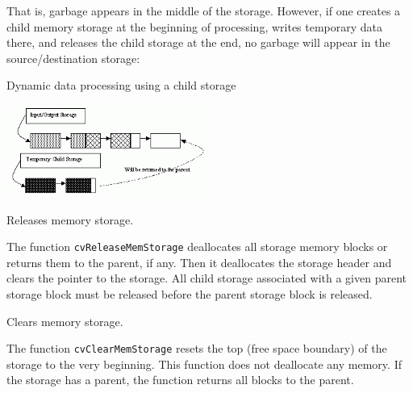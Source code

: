 That is, garbage appears in the middle of the storage. However, if
one creates a child memory storage at the beginning of processing,
writes temporary data there, and releases the child storage at the end,
no garbage will appear in the source/destination storage:

Dynamic data processing using a child storage

\includegraphics[width=0.5\textwidth]{pics/memstorage2.png}

\label{ReleaseMemStorage}

Releases memory storage.


\begin{description}
\end{description}

The function \texttt{cvReleaseMemStorage} deallocates all storage memory
blocks or returns them to the parent, if any. Then it deallocates the
storage header and clears the pointer to the storage. All child storage 
associated with a given parent storage block must be released before the 
parent storage block is released.

\label{ClearMemStorage}

Clears memory storage.


\begin{description}
\end{description}

The function \texttt{cvClearMemStorage} resets the top (free space
boundary) of the storage to the very beginning. This function does not
deallocate any memory. If the storage has a parent, the function returns
all blocks to the parent.

\label{MemStorageAlloc}

